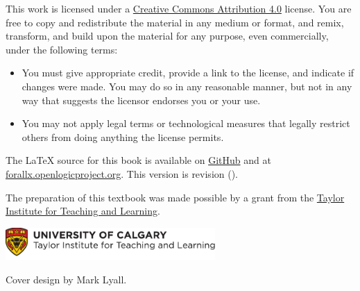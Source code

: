 \bigskip

\noindent \footnotesize This work is licensed under a \href{https://creativecommons.org/licenses/by/4.0/}{Creative Commons Attribution 4.0} license. 
You are free to copy and redistribute the material in any medium or format, and  remix, transform, and build upon the material for any purpose, even commercially, under the following terms:
\begin{itemize}
\item You must give appropriate credit, provide a link to the license, and indicate if changes were made. You may do so in any reasonable manner, but not in any way that suggests the licensor endorses you or your use.
\item You may not apply legal terms or technological measures that legally restrict others from doing anything the license permits.
\end{itemize}

\vfil\normalsize\noindent
The \LaTeX{} source for this book is available
on \href{https://github.com/rzach/forallx-yyc/}{GitHub} and at \href{https://forallx.openlogicproject.org}{forallx.openlogicproject.org}. This version
is revision \gitAbbrevHash{} (\gitAuthorDate).

\bigskip
\noindent The preparation of this textbook was made possible by a grant from the \href{https://www.ucalgary.ca/taylorinstitute/}{Taylor Institute for Teaching and Learning}.

\bigskip
\noindent
\href{https://www.ucalgary.ca/taylorinstitute/}{\includegraphics[width=8cm]{assets/ti-color}}

\bigskip
\noindent Cover design by Mark Lyall.